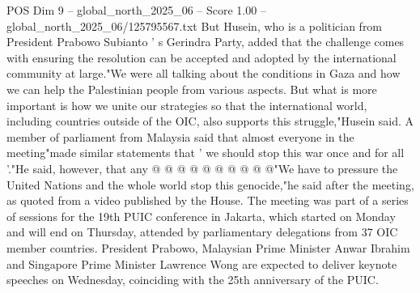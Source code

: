 \begin{textsample}{POS Dim 9 – global\_north\_2025\_06 – Score 1.00 – global\_north\_2025\_06/125795567.txt}
But Husein, who is a politician from President Prabowo Subianto ' s Gerindra Party, added that the challenge comes with ensuring the resolution can be accepted and adopted by the international community at large."We were all talking about the conditions in Gaza and how we can help the Palestinian people from various aspects.
But what is more important is how we unite our strategies so that the international world, including countries outside of the OIC, also supports this struggle,"Husein said.
A member of parliament from Malaysia said that almost everyone in the meeting"made similar statements that ' we should stop this war once and for all '."He said, however, that any @ @ @ @ @ @ @ @ @ @"We have to pressure the United Nations and the whole world stop this genocide,"he said after the meeting, as quoted from a video published by the House.
The meeting was part of a series of sessions for the 19th PUIC conference in Jakarta, which started on Monday and will end on Thursday, attended by parliamentary delegations from 37 OIC member countries.
President Prabowo, Malaysian Prime Minister Anwar Ibrahim and Singapore Prime Minister Lawrence Wong are expected to deliver keynote speeches on Wednesday, coinciding with the 25th anniversary of the PUIC.

\end{textsample}
